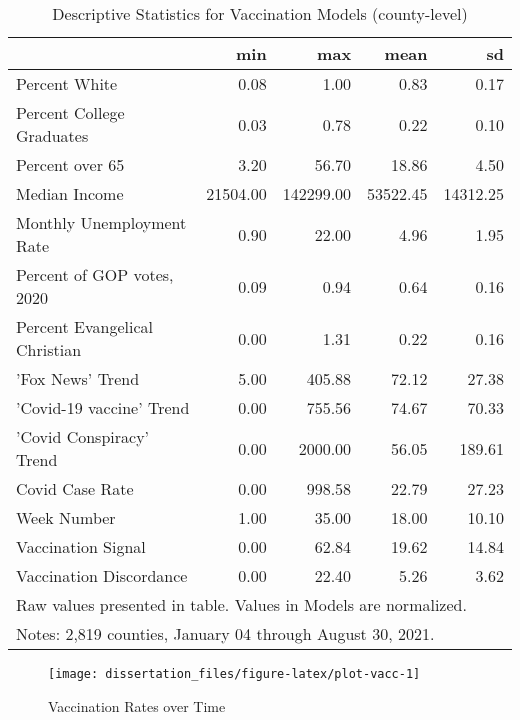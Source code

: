 \begin{table}[!h]

\caption{\label{tab:vacc-desc-table}Descriptive Statistics for Vaccination Models (county-level)}
\centering
\begin{tabular}[t]{lrrrr}
\toprule
  & min & max & mean & sd\\
\midrule
Percent White & \num{0.08} & \num{1.00} & \num{0.83} & \num{0.17}\\
Percent College Graduates & \num{0.03} & \num{0.78} & \num{0.22} & \num{0.10}\\
Percent over 65 & \num{3.20} & \num{56.70} & \num{18.86} & \num{4.50}\\
Median Income & \num{21504.00} & \num{142299.00} & \num{53522.45} & \num{14312.25}\\
Monthly Unemployment Rate & \num{0.90} & \num{22.00} & \num{4.96} & \num{1.95}\\
Percent of GOP votes, 2020 & \num{0.09} & \num{0.94} & \num{0.64} & \num{0.16}\\
Percent Evangelical Christian & \num{0.00} & \num{1.31} & \num{0.22} & \num{0.16}\\
'Fox News' Trend & \num{5.00} & \num{405.88} & \num{72.12} & \num{27.38}\\
'Covid-19 vaccine' Trend & \num{0.00} & \num{755.56} & \num{74.67} & \num{70.33}\\
'Covid Conspiracy' Trend & \num{0.00} & \num{2000.00} & \num{56.05} & \num{189.61}\\
Covid Case Rate & \num{0.00} & \num{998.58} & \num{22.79} & \num{27.23}\\
Week Number & \num{1.00} & \num{35.00} & \num{18.00} & \num{10.10}\\
Vaccination Signal & \num{0.00} & \num{62.84} & \num{19.62} & \num{14.84}\\
Vaccination Discordance & \num{0.00} & \num{22.40} & \num{5.26} & \num{3.62}\\
\bottomrule
\multicolumn{5}{l}{\rule{0pt}{1em}Raw values presented in table. Values in Models are normalized.}\\
\multicolumn{5}{l}{\rule{0pt}{1em}Notes: 2,819 counties, January 04 through August 30, 2021.}\\
\end{tabular}
\end{table}
\begin{figure}

{\centering \texttt{[image: dissertation\_files/figure-latex/plot-vacc-1]} 

}

\caption{Vaccination Rates over Time}\label{fig:plot-vacc}
\end{figure}


